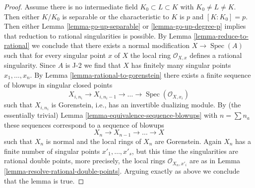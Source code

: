 \documentclass[10pt,a4paper]{amsart}
\theoremstyle{plain}
\theoremstyle{definition}
\theoremstyle{remark}
\numberwithin{equation}{subsection}
\def\Spec{\mathop{\mathrm{Spec}}}
\begin{document}
\begin{proof}
\medskip\noindent
Assume there is no intermediate field $K_0 \subset L \subset K$
with $K_0 \not = L \not = K$. Then either $K/K_0$ is separable
or the characteristic to $K$ is $p$ and $[K : K_0] = p$.
Then either Lemma \ref{lemma-go-up-separable} or \ref{lemma-go-up-degree-p}
implies that reduction to rational singularities is possible.
By Lemma \ref{lemma-reduce-to-rational} we conclude that there exists a
normal modification $X \to \Spec(A)$ such that for
every singular point $x$ of $X$ the local ring $\mathcal{O}_{X, x}$
defines a rational singularity. Since $A$ is J-2 we find that $X$ has
finitely many singular points $x_1, \ldots, x_n$.
By Lemma \ref{lemma-rational-to-gorenstein}
there exists a finite sequence of blowups in singular closed points
$$
X_{i, n_i} \to X_{i, n_i - 1} \to \ldots \to \Spec(\mathcal{O}_{X, x_i})
$$
such that $X_{i, n_i}$ is Gorenstein, i.e., has an
invertible dualizing module. By (the essentially trivial)
Lemma \ref{lemma-equivalence-sequence-blowups}
with $n = \sum n_a$ these sequences correspond to a sequence of
blowups
$$
X_n \to X_{n - 1} \to \ldots \to X
$$
such that $X_n$ is normal and the local rings of $X_n$ are Gorenstein.
Again $X_n$ has a finite number of singular points
$x'_1, \ldots, x'_s$, but this time the singularities are
rational double points, more precisely, the local rings
$\mathcal{O}_{X_n, x'_i}$ are as in
Lemma \ref{lemma-resolve-rational-double-points}.
Arguing exactly as above we conclude that the lemma is true.
\end{proof}
\end{document}
